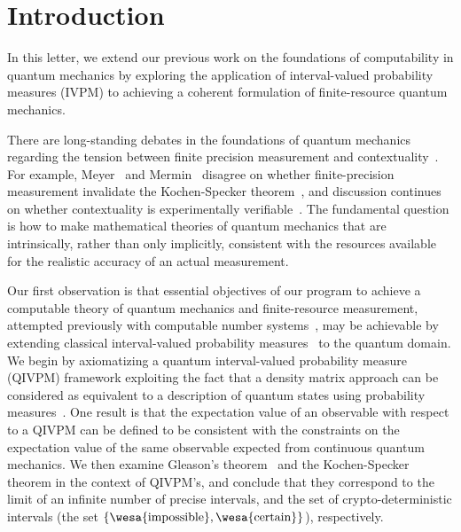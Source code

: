 \documentclass[english,reprint, aps, prl,superscriptaddress, showpacs,
showkeys, longbibliography, amsmath, amssymb]{revtex4-1}
\theoremstyle{plain}
\theoremstyle{definition}
\newcommand{\imposs}{{\text{\wesa{impossible}}}}
\newcommand{\necess}{{\text{\wesa{certain}}}}
\begin{document}
\maketitle

\section{Introduction}

In this letter, we extend our previous work on the foundations of
computability in quantum mechanics by exploring the application of
interval-valued probability measures (IVPM) to achieving a coherent
formulation of finite-resource quantum mechanics.

There are long-standing debates in the foundations of quantum
mechanics regarding the tension between finite precision measurement
and contextuality~\cite{Peres2003,BarrettKent2004}.  For example,
Meyer~\cite{PhysRevLett.83.3751} and Mermin~\cite{Mermin1999} disagree
on whether finite-precision measurement invalidate the Kochen-Specker
theorem~\cite{kochenspecker1967,peres1995quantum}, and discussion
continues on whether contextuality is experimentally
verifiable~\cite{Spekkens2005,GuehneKleinmannCabelloEtAl2010,MazurekPuseyKunjwalEtAl2016}. The
fundamental question is how to make mathematical theories of quantum
mechanics that are intrinsically, rather than only implicitly,
consistent with the resources available for the realistic accuracy of
an actual measurement.

Our first observation is that essential objectives of our program to
achieve a computable theory of quantum mechanics and finite-resource
measurement, attempted previously with computable number
systems~\cite{usat,geometry2013,DQT2014}, may be achievable by
extending classical interval-valued probability
measures~\cite{JamisonLodwick2004} to the quantum domain.  We begin by
axiomatizing a quantum interval-valued probability measure (QIVPM)
framework exploiting the fact that a density matrix approach can be
considered as equivalent to a description of quantum states using
probability
measures~\cite{10.2307/2308516,Varadarajan2008}. %
One result is that the expectation value of an observable with respect
to a QIVPM can be defined to be consistent with the constraints on the
expectation value of the same observable expected from continuous
quantum mechanics.  We then examine Gleason's
theorem~\cite{gleason1957,Redhead1987-REDINA,peres1995quantum} and the
Kochen-Specker theorem in the context of QIVPM's, and conclude
that they correspond to the limit of an infinite number of precise
intervals, and the set of crypto-deterministic intervals (the set
$\{\imposs,\necess\}$), respectively.
\end{document}
